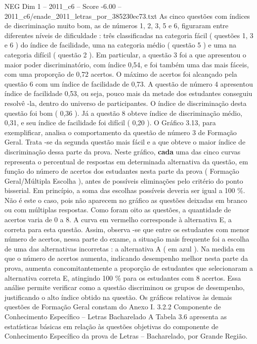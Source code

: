 \begin{textsample}{NEG Dim 1 – 2011\_c6 – Score -6.00 – 2011\_c6/enade\_2011\_letras\_por\_385230ec73.txt}
As cinco questões com índices de discriminação muito bom, as de números 1, 2, 3, 5 e 6, figuraram entre diferentes níveis de dificuldade : três classificadas na categoria fácil ( questões 1, 3 e 6 ) do índice de facilidade, uma na categoria médio ( questão 5 ) e uma na categoria difícil ( questão 2 ).
Em particular, a questão 3 foi a que apresentou o maior poder discriminatório, com índice 0,54, e foi também uma das mais fáceis, com uma proporção de 0,72 acertos.
O máximo de acertos foi alcançado pela questão 6 com um índice de facilidade de 0,73.
A questão de número 4 apresentou índice de facilidade 0,53, ou seja, pouco mais da metade dos estudantes conseguiu resolvê -la, dentro do universo de participantes.
O índice de discriminação desta questão foi bom ( 0,36 ).
Já a questão 8 obteve índice de discriminação médio, 0,31, e seu índice de facilidade foi difícil ( 0,20 ).
O Gráfico 3.13, para exemplificar, analisa o comportamento da questão de número 3 de Formação Geral.
Trata -se da segunda questão mais fácil e a que obteve o maior índice de discriminação dessa parte da prova.
Neste gráfico, \textbf{cada} uma das cinco curvas representa o percentual de respostas em determinada alternativa da questão, em função do número de acertos dos estudantes nesta parte da prova ( Formação Geral/Múltipla Escolha ), antes de possíveis eliminações pelo critério do ponto bisserial.
Em princípio, a soma das escolhas possíveis deveria ser igual a 100 \%.
Não é este o caso, pois não aparecem no gráfico as questões deixadas em branco ou com múltiplas respostas.
Como foram oito as questões, a quantidade de acertos varia de 0 a 8.
A curva em vermelho corresponde à alternativa E, a correta para esta questão.
Assim, observa -se que entre os estudantes com menor número de acertos, nessa parte do exame, a situação mais frequente foi a escolha de uma das alternativas incorretas : a alternativa A ( em azul ).
Na medida em que o número de acertos aumenta, indicando desempenho melhor nesta parte da prova, aumenta concomitantemente a proporção de estudantes que selecionaram a alternativa correta E, atingindo 100 \% para os estudantes com 8 acertos.
Essa análise permite verificar como a questão discriminou os grupos de desempenho, justificando o alto índice obtido na questão.
Os gráficos relativos às demais questões de Formação Geral constam do Anexo I. 3.2.2 Componente de Conhecimento Específico – Letras Bacharelado A Tabela 3.6 apresenta as estatísticas básicas em relação às questões objetivas do componente de Conhecimento Específico da prova de Letras – Bacharelado, por Grande Região.

\end{textsample}
